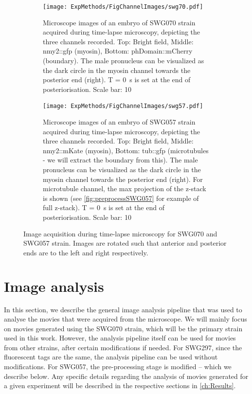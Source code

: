 \begin{figure}[h]
\centering
\begin{subfigure}{\textwidth}
    \centering
    \texttt{[image: ExpMethods/FigChannelImages/swg70.pdf]}
    \caption{Microscope images of an embryo of SWG070 strain acquired during time-lapse microscopy, depicting the three channels recorded. Top: Bright field, Middle: \ac{nmy2}::\ac{gfp} (myosin), Bottom: phDomain::mCherry (boundary). The male pronucleus can be visualized as the dark circle in the myosin channel towards the posterior end (right). T = \SI{0}{\second} is set at the end of posteriorisation. Scale bar: \SI{10}{\unitLength}} 
    \label{subfig:imageAcquisition-swg070}
\end{subfigure}
\hfill
\begin{subfigure}{\textwidth}
    \centering
    \texttt{[image: ExpMethods/FigChannelImages/swg57.pdf]}
    \caption{Microscope images of an embryo of SWG057 strain acquired during time-lapse microscopy, depicting the three channels recorded. Top: Bright field, Middle: \ac{nmy2}::mKate (myosin), Bottom: tub::\ac{gfp} (microtubules - we will extract the boundary from this). The male pronucleus can be visualized as the dark circle in the myosin channel towards the posterior end (right). For microtubule channel, the max projection of the z-stack is shown (see \autoref{fig:preprocessSWG057} for example of full z-stack). T = \SI{0}{\second} is set at the end of posteriorisation. Scale bar: \SI{10}{\unitLength}} 
    \label{subfig:imageAcquisition-swg057}
\end{subfigure}
\caption[Image acquisition]{Image acquisition during time-lapse microscopy for SWG070 and SWG057 strain. Images are rotated such that anterior and posterior ends are to the left and right respectively.}
\label{fig:imageAcquisition}
\end{figure}

\section{Image analysis}\label{sec:imageAnalysis}
In this section, we describe the general image analysis pipeline that was used to analyse the movies that were acquired from the microscope. We will mainly focus on movies generated using the SWG070 strain, which will be the primary strain used in this work. However, the analysis pipeline itself can be used for movies from other strains, after certain modifications if needed. For SWG297, since the fluorescent tags are the same, the analysis pipeline can be used without modifications. For SWG057, the pre-processing stage is modified -- which we describe below. Any specific details regarding the analysis of movies generated for a given experiment will be described in the respective sections in \autoref{ch:Results}.

